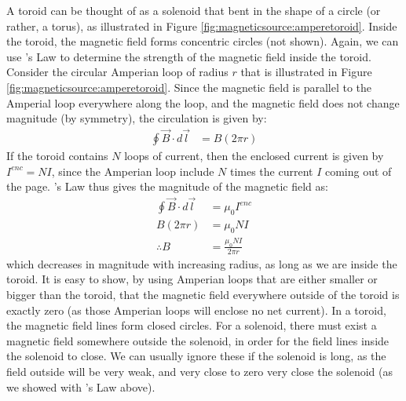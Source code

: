 A toroid can be thought of as a solenoid that bent in the shape of a circle (or rather, a torus), as illustrated in Figure \ref{fig:magneticsource:amperetoroid}. Inside the toroid, the magnetic field forms concentric circles (not shown). 
Again, we can use \ampere's Law to determine the strength of the magnetic field inside the toroid. Consider the circular Amperian loop of radius $r$ that is illustrated in Figure \ref{fig:magneticsource:amperetoroid}. Since the magnetic field is parallel to the Amperial loop everywhere along the loop, and the magnetic field does not change magnitude (by symmetry), the circulation is given by:
\begin{align*}
\oint \vec B \cdot d\vec l &= B (2\pi r)
\end{align*}
If the toroid contains $N$ loops of current, then the enclosed current is given by $I^{enc}=NI$, since the Amperian loop include $N$ times the current $I$ coming out of the page. \ampere's Law thus gives the magnitude of the magnetic field as:
\begin{align*}
\oint \vec B \cdot d\vec l &=\mu_0 I^{enc}\\
B (2\pi r) &= \mu_0 NI\\
\therefore B&=\frac{\mu_0 NI}{2\pi r}
\end{align*}
which decreases in magnitude with increasing radius, as long as we are inside the toroid. It is easy to show, by using Amperian loops that are either smaller or bigger than the toroid, that the magnetic field everywhere outside of the toroid is exactly zero (as those Amperian loops will enclose no net current). In a toroid, the magnetic field lines form closed circles. For a solenoid, there must exist a magnetic field somewhere outside the solenoid, in order for the field lines inside the solenoid to close. We can usually ignore these if the solenoid is long, as the field outside will be very weak, and very close to zero very close the solenoid (as we showed with \ampere's Law above). 

